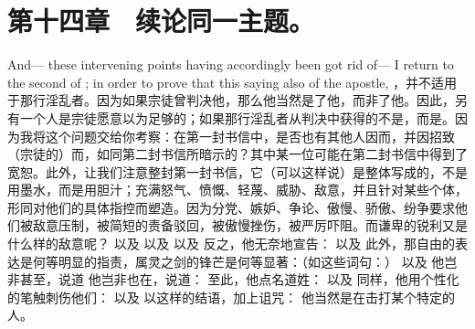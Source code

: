 
\section{第十四章　续论同一主题。}

And— these intervening points having accordingly been got rid of— I return to the second of ; in order to prove that this saying also of the apostle, ，并不适用于那行淫乱者。因为如果宗徒曾判决他，那么他当然是了他，而非了他。因此，另有一个人是宗徒愿意以为足够的；如果那行淫乱者从判决中获得的不是，而是。因为我将这个问题交给你考察：在第一封书信中，是否也有其他人因而，并因招致（宗徒的）而，如同第二封书信所暗示的？其中某一位可能在第二封书信中得到了宽恕。此外，让我们注意整封第一封书信，它（可以这样说）是整体写成的，不是用墨水，而是用胆汁；充满怒气、愤慨、轻蔑、威胁、敌意，并且针对某些个体，形同对他们的具体指控而塑造。因为分党、嫉妒、争论、傲慢、骄傲、纷争要求他们被敌意压制，被简短的责备驳回，被傲慢挫伤，被严厉吓阻。而谦卑的锐利又是什么样的敌意呢？  以及 以及 以及 反之，他无奈地宣告： 以及  此外，那自由的表达是何等明显的指责，属灵之剑的锋芒是何等显著：（如这些词句：） 以及 他岂非甚至，说道 他岂非也在，说道： 至此，他点名道姓： 以及 同样，他用个性化的笔触刺伤他们： 以及 以这样的结语，加上诅咒： 他当然是在击打某个特定的人。\par

